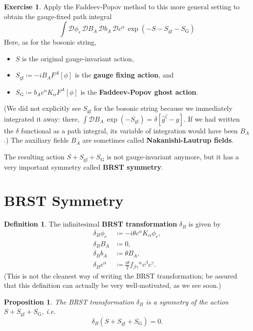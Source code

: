 \documentclass{report}
\theoremstyle{plain}
\newtheorem{proposition}[theorem]{Proposition}
\theoremstyle{definition}
\newtheorem{definition}[theorem]{Definition}
\newtheorem{exercise}{Exercise}[section]
\theoremstyle{remark}
\newcommand{\cD}{\mathcal{D}}
\begin{document}
\begin{exercise}
  Apply the Faddeev-Popov method to this more general setting to
  obtain the gauge-fixed path integral
  \[ \int \cD \phi_r \, \cD B_A \, \cD b_A \, \cD c^\alpha \, \exp(-S - S_{\text{gf}} - S_{\text{G}}) \]
  Here, as for the bosonic string,
  \begin{itemize}
  \item $S$ is the original gauge-invariant action,
  \item $S_{\text{gf}} \coloneqq -i B_A F^A[\phi]$ is the {\bf gauge
    fixing action}, and
  \item $S_{\text{G}} \coloneqq b_A c^\alpha K_\alpha F^A[\phi]$ is
    the {\bf Faddeev-Popov ghost action}.
  \end{itemize}
  (We did not explicitly see $S_{\text{gf}}$ for the bosonic string
  because we immediately integrated it away: there, $\int \cD B_A \,
  \exp(-S_{\text{gf}}) = \delta[\hat{g}^\zeta - g]$. If we had written
  the $\delta$ functional as a path integral, its variable of
  integration would have been $B_A$.) The auxiliary fields $B_A$ are
  sometimes called {\bf Nakanishi-Lautrup fields}.
\end{exercise}

The resulting action $S + S_{\text{gf}} + S_{\text{G}}$ is not
gauge-invariant anymore, but it has a very important symmetry called
{\bf BRST symmetry}.

\section{BRST Symmetry}

\begin{definition}
  The infinitesimal {\bf BRST transformation} $\delta_B$ is given by
  \begin{align*}
    \delta_B\phi_r &\coloneqq -i\theta c^\alpha K_\alpha\phi_r, \\
    \delta_B B_A &\coloneqq 0, \\
    \delta_B b_A &\coloneqq \theta B_A, \\
    \delta_B c^\alpha &\coloneqq \frac{i\theta}{2} f_{\beta\gamma}{}^\alpha c^\beta c^\gamma.
  \end{align*}
  (This is not the cleanest way of writing the BRST transformation; be
  assured that this definition can actually be very well-motivated, as
  we see soon.)
\end{definition}

\begin{proposition}
  The BRST transformation $\delta_B$ is a symmetry of the action $S +
  S_{\text{gf}} + S_{\text{G}}$, i.e.
  \[ \delta_B(S + S_{\text{gf}} + S_{\text{G}}) = 0. \]
\end{proposition}
\end{document}
